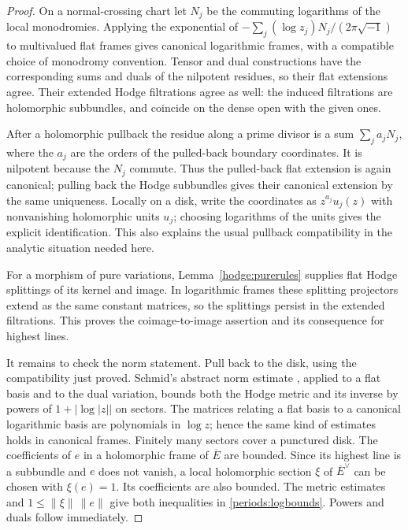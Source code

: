 \begin{proof}
On a normal-crossing chart let $N_j$ be the commuting logarithms of the
local monodromies.  Applying the exponential of
$-\sum_j(\log z_j)N_j/(2\pi\sqrt{-1})$ to multivalued flat frames gives
canonical logarithmic frames, with a compatible choice of monodromy
convention.  Tensor and dual constructions have the corresponding sums
and duals of the nilpotent residues, so their flat extensions agree.
Their extended Hodge filtrations agree as well: the induced filtrations
are holomorphic subbundles, and coincide on the dense open with the given
ones.

After a holomorphic pullback the residue along a prime divisor is a sum
$\sum_j a_jN_j$, where the $a_j$ are the orders of the pulled-back boundary
coordinates.  It is nilpotent because the $N_j$ commute.  Thus the pulled-back
flat extension is again canonical; pulling back the Hodge subbundles gives
their canonical extension by the same uniqueness.  Locally on a disk,
write the coordinates as $z^{a_j}u_j(z)$ with nonvanishing holomorphic
units $u_j$; choosing logarithms of the units gives the explicit
identification.  This also explains the usual pullback compatibility
\cite[Lemma~5.6]{BFMT25} in the analytic situation needed here.

For a morphism of pure variations, Lemma~\ref{hodge:purerules} supplies
flat Hodge splittings of its kernel and image.  In logarithmic frames
these splitting projectors extend as the same constant matrices, so the
splittings persist in the extended filtrations.  This proves the
coimage-to-image assertion and its consequence for highest lines.

It remains to check the norm statement.  Pull back to the disk, using the
compatibility just proved.  Schmid's abstract norm estimate
\cite[Theorem~6.6$'$]{Schmid73}, applied to a flat basis and to the dual
variation, bounds both the Hodge metric and its inverse by powers of
$1+|\log|z||$ on sectors.  The matrices relating a flat basis to a
canonical logarithmic basis are polynomials in $\log z$; hence the same
kind of estimates holds in canonical frames.  Finitely many sectors
cover a punctured disk.  The coefficients of $e$ in a holomorphic frame
of $\overline E$ are bounded.  Since its highest line is a subbundle and
$e$ does not vanish, a local holomorphic section $\xi$ of
$\overline E^{\vee}$ can be chosen with $\xi(e)=1$.  Its coefficients are
also bounded.  The metric estimates and
$1\leq\|\xi\|\,\|e\|$ give both inequalities in
\eqref{periods:logbounds}.  Powers and duals follow immediately.
\end{proof}

